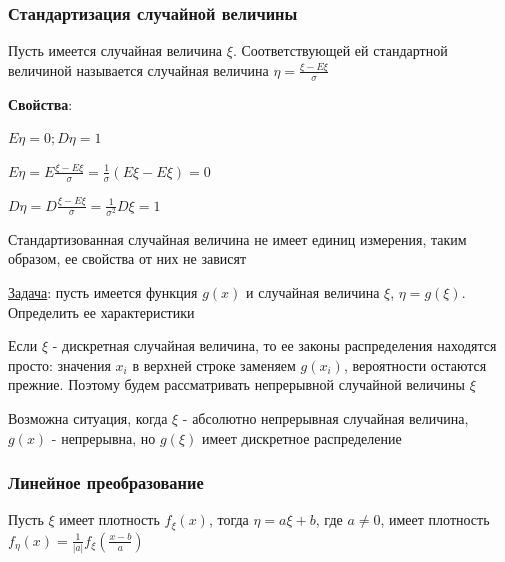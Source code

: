 \documentclass[12pt]{article}
\begin{document}
    \hypertarget{standardizationofrandomvalue}{}

    \subsubsection{Стандартизация случайной величины}

    \Def Пусть имеется случайная величина $\xi$. Соответствующей ей стандартной величиной называется
    случайная величина $\eta = \frac{\xi - E\xi}{\sigma}$

    \textbf{Свойства}:

    $E\eta = 0; D\eta = 1$

    \begin{MyProof}
        $E\eta = E \frac{\xi - E\xi}{\sigma} = \frac{1}{\sigma} (E\xi - E\xi) = 0$

        $D\eta = D \frac{\xi - E\xi}{\sigma} = \frac{1}{\sigma^2} D\xi = 1$
    \end{MyProof}

    Стандартизованная случайная величина не имеет единиц измерения, таким образом, ее свойства от них не зависят

    \mediumvspace

    \underline{Задача}: пусть имеется функция $g(x)$ и случайная величина $\xi$, $\eta = g(\xi)$. Определить ее характеристики

    \Nota Если $\xi$ - дискретная случайная величина, то ее законы распределения находятся просто: значения $x_i$ в верхней строке заменяем $g(x_i)$, вероятности остаются прежние.
    Поэтому будем рассматривать непрерывной случайной величины $\xi$

    \Notas Возможна ситуация, когда $\xi$ - абсолютно непрерывная случайная величина, $g(x)$ - непрерывна, но $g(\xi)$ имеет дискретное распределение

    \subsubsection{Линейное преобразование}

    \hypertarget{lineartransformation}{}

    \begin{MyTheorem}
        \Ths Пусть $\xi$ имеет плотность $f_\xi(x)$, тогда $\eta = a\xi + b$, где $a \neq 0$, имеет плотность $f_\eta(x) = \frac{1}{|a|}f_\xi\left(\frac{x - b}{a}\right)$
    \end{MyTheorem}
\end{document}
